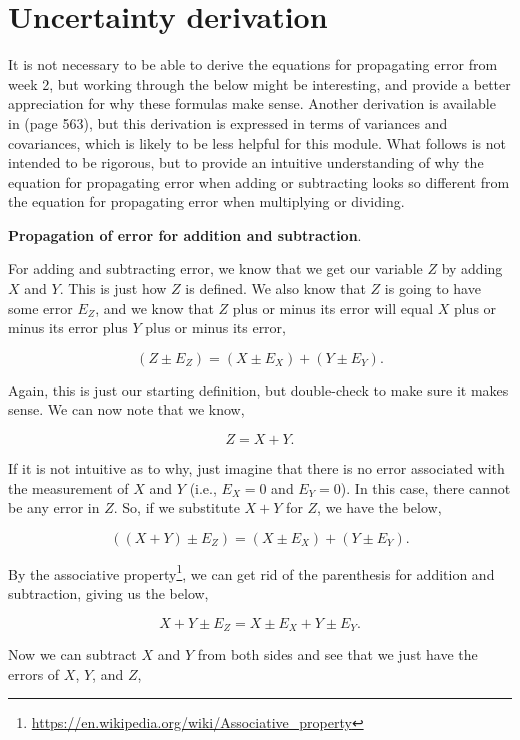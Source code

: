 \documentclass[
  openany]{krantz}
\renewcommand{\href}[2]{#2\footnote{\url{#1}}}
\begin{document}
\hypertarget{uncertainty_derivation}{%
\chapter{Uncertainty derivation}\label{uncertainty_derivation}}

It is not necessary to be able to derive the equations for propagating error from week 2, but working through the below might be interesting, and provide a better appreciation for why these formulas make sense.
Another derivation is available in \citet{Box1978} (page 563), but this derivation is expressed in terms of variances and covariances, which is likely to be less helpful for this module.
What follows is not intended to be rigorous, but to provide an intuitive understanding of why the equation for propagating error when adding or subtracting looks so different from the equation for propagating error when multiplying or dividing.

\textbf{Propagation of error for addition and subtraction}.

For adding and subtracting error, we know that we get our variable \(Z\) by adding \(X\) and \(Y\). This is just how \(Z\) is defined. We also know that \(Z\) is going to have some error \(E_Z\), and we know that \(Z\) plus or minus its error will equal \(X\) plus or minus its error plus \(Y\) plus or minus its error,

\[(Z \pm E_Z) = (X  \pm E_X) + (Y \pm E_Y).\]

Again, this is just our starting definition, but double-check to make sure it makes sense. We can now note that we know,

\[Z =X+Y.\]

If it is not intuitive as to why, just imagine that there is no error associated with the measurement of \(X\) and \(Y\) (i.e., \(E_{X} = 0\) and \(E_{Y} = 0\)).
In this case, there cannot be any error in \(Z\). So, if we substitute \(X + Y\) for \(Z\), we have the below,

\[((X + Y) \pm E_Z) = (X  \pm E_X) + (Y \pm E_Y).\]

By the \href{https://en.wikipedia.org/wiki/Associative_property}{associative property}, we can get rid of the parenthesis for addition and subtraction, giving us the below,

\[X + Y \pm E_Z = X  \pm E_X + Y \pm E_Y.\]

Now we can subtract \(X\) and \(Y\) from both sides and see that we just have the errors of \(X\), \(Y\), and \(Z\),
\end{document}
